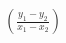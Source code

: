 \documentclass[preview]{standalone}
\begin{document}
\begin{align*}
(\frac{y_{1}-y_{2}}{x_{1}-x_{2}})
\end{align*}
\end{document}
